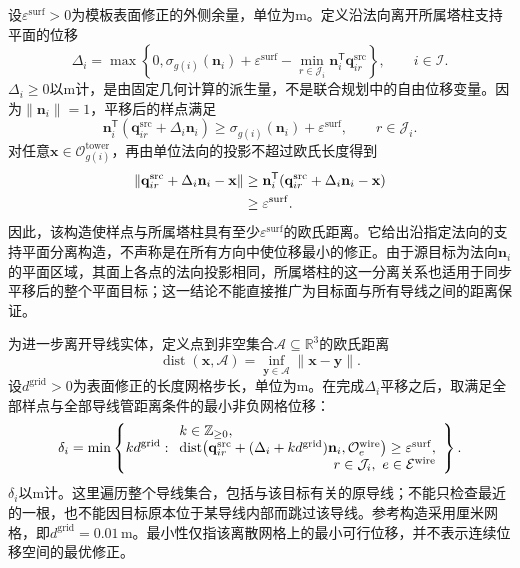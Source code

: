设$\varepsilon^{\mathrm{surf}}>0$为模板表面修正的外侧余量，单位为$\mathrm m$。定义沿法向离开所属塔柱支持平面的位移
\begin{equation}
 \Delta_i=\max\left\{0,
 \sigma_{g(i)}(\mathbf n_i)+\varepsilon^{\mathrm{surf}}
 -\min_{r\in\mathcal J_i}
       \mathbf n_i^{\mathsf T}\mathbf q_{ir}^{\mathrm{src}}
 \right\},
 \qquad i\in\mathcal I.
 \label{s0406:tower_shift}
\end{equation}
$\Delta_i\ge0$以$\mathrm m$计，是由固定几何计算的派生量，不是联合规划中的自由位移变量。因为$\|\mathbf n_i\|=1$，平移后的样点满足
\begin{equation}
 \mathbf n_i^{\mathsf T}
  (\mathbf q_{ir}^{\mathrm{src}}+\Delta_i\mathbf n_i)
 \ge\sigma_{g(i)}(\mathbf n_i)+\varepsilon^{\mathrm{surf}},
 \qquad r\in\mathcal J_i.
 \label{s0406:shifted_support_separation}
\end{equation}
对任意$\mathbf x\in\mathcal O_{g(i)}^{\mathrm{tower}}$，再由单位法向的投影不超过欧氏长度得到
\begin{align}
 \|\mathbf q_{ir}^{\mathrm{src}}+\Delta_i\mathbf n_i-\mathbf x\|
 &\ge\mathbf n_i^{\mathsf T}
       (\mathbf q_{ir}^{\mathrm{src}}+\Delta_i\mathbf n_i-\mathbf x)
 \notag\\
 &\ge\varepsilon^{\mathrm{surf}}.
 \label{s0406:support_distance_bound}
\end{align}
因此，该构造使样点与所属塔柱具有至少$\varepsilon^{\mathrm{surf}}$的欧氏距离。它给出沿指定法向的支持平面分离构造，不声称是在所有方向中使位移最小的修正。由于源目标为法向$\mathbf n_i$的平面区域，其面上各点的法向投影相同，所属塔柱的这一分离关系也适用于同步平移后的整个平面目标；这一结论不能直接推广为目标面与所有导线之间的距离保证。

为进一步离开导线实体，定义点到非空集合$\mathcal A\subseteq\mathbb R^3$的欧氏距离
\begin{equation}
 \operatorname{dist}(\mathbf x,\mathcal A)
 =\inf_{\mathbf y\in\mathcal A}\|\mathbf x-\mathbf y\|.
 \label{s0406:set_distance}
\end{equation}
设$d^{\mathrm{grid}}>0$为表面修正的长度网格步长，单位为$\mathrm m$。在完成$\Delta_i$平移之后，取满足全部样点与全部导线管距离条件的最小非负网格位移：
\begin{equation}
 \delta_i=\min\left\{k d^{\mathrm{grid}}:
 \begin{array}{l}
 k\in\mathbb Z_{\ge0},\\
 \operatorname{dist}\bigl(
 \mathbf q_{ir}^{\mathrm{src}}
 +(\Delta_i+k d^{\mathrm{grid}})\mathbf n_i,
 \mathcal O_e^{\mathrm{wire}}\bigr)
 \ge\varepsilon^{\mathrm{surf}},\\
 \hfill r\in\mathcal J_i,\ e\in\mathcal E^{\mathrm{wire}}
 \end{array}\right\}.
 \label{s0406:wire_grid_shift}
\end{equation}
$\delta_i$以$\mathrm m$计。这里遍历整个导线集合，包括与该目标有关的原导线；不能只检查最近的一根，也不能因目标原本位于某导线内部而跳过该导线。参考构造采用厘米网格，即$d^{\mathrm{grid}}=0.01\,\mathrm m$。最小性仅指该离散网格上的最小可行位移，并不表示连续位移空间的最优修正。


